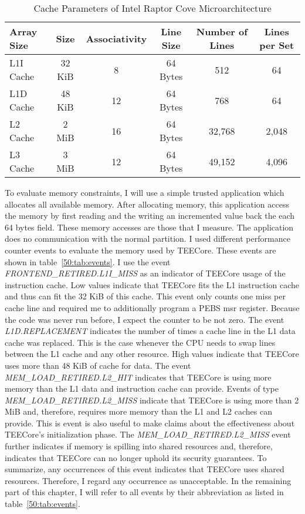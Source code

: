 \begin{table}[ht]
  \centering
  \begin{tabular}{ |l||c|c|c|c|c| }
    \hline
    Array Size & Size   & Associativity   & Line Size & Number of Lines & Lines per Set \\
    \hline
    L1I Cache  & 32 KiB & 8               & 64 Bytes  & 512             & 64            \\
    L1D Cache  & 48 KiB & 12              & 64 Bytes  & 768             & 64            \\
    L2 Cache   & 2 MiB  & 16              & 64 Bytes  & 32,768          & 2,048         \\
    L3 Cache   & 3 MiB  & 12              & 64 Bytes  & 49,152          & 4,096         \\
    \hline
  \end{tabular}
  \caption{Cache Parameters of Intel Raptor Cove Microarchitecture}
  \label{50:tab:cache_size}
\end{table}

To evaluate memory constraints, I will use a simple trusted application which
allocates all available memory. After allocating memory, this application access
the memory by first reading and the writing an incremented value back the each
64 bytes field. These memory accesses are those that I measure. The application
does no communication with the normal partition. I used different performance
counter events to evaluate the memory used by TEECore. These events are shown in
table~\ref{50:tab:events}. I use the event \textit{FRONTEND\_RETIRED.L1I\_MISS}
as an indicator of TEECore usage of the instruction cache. Low values indicate
that TEECore fits the L1 instruction cache and thus can fit the 32 KiB of this
cache. This event only counts one miss per cache line and required me to
additionally program a PEBS \gls{msr} register. Because the code was never run
before, I expect the counter to be not zero. The event \textit{L1D.REPLACEMENT}
indicates the number of times a cache line in the L1 data cache was replaced.
This is the case whenever the CPU needs to swap lines between the L1 cache and
any other resource. High values indicate that TEECore uses more than 48 KiB of
cache for data. The event \textit{MEM\_LOAD\_RETIRED.L2\_HIT} indicates that
TEECore is using more memory than the L1 data and instruction cache can provide.
Events of type \textit{MEM\_LOAD\_RETIRED.L2\_MISS} indicate that TEECore is
using more than 2 MiB and, therefore, requires more memory than the L1 and L2
caches can provide. This is event is also useful to make claims about the
effectiveness about TEECore's initialization phase. The
\textit{MEM\_LOAD\_RETIRED.L2\_MISS} event further indicates if memory is
spilling into shared resources and, therefore, indicates that TEECore can no
longer uphold its security guarantees. To summarize, any occurrences of this
event indicates that TEECore uses shared resources. Therefore, I regard any
occurrence as unacceptable. In the remaining part of this chapter, I will refer
to all events by their abbreviation as listed in table~\ref{50:tab:events}.

